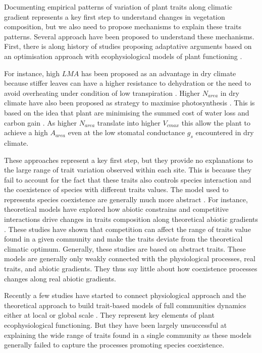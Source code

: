 \documentclass[a4paper,11pt]{article}
\begin{document}
Documenting empirical patterns of variation of plant traits along
climatic gradient represents a key first step to understand changes in
vegetation composition, but we also need to propose mechanisms to
explain these traits patterns. Several approach have been proposed to
understand these mechanisms. First, there is along history of studies
proposing adaptative arguments based on an optimisation approach with
ecophysiological models of plant functioning \citep{Makela-2002}.

For instance, high $LMA$ has been proposed as an advantage in dry climate because
stiffer leaves can have a higher resistance to dehydration
\citep{Wright-2002a,Wright-2002b} or the need to avoid overheating
under condition of low transpiration \citep{Leigh-2012}. Higher
$N_{area}$ in dry climate have also been proposed as strategy to
maximise photosynthesis \citep{Wright-2003}. This is
based on the idea that plant are minimising the summed cost of water
loss and carbon gain
\citep{Medlyn-2002,Wright-2003,Prentice-2014,Lu-2016,Wang-2017,Dong-2017}. As
higher $N_{area}$ translate into higher $V_{cmax}$ this allow the
plant to achieve a high $A_{area}$ even at the low stomatal conductance
$g_s$ encountered in dry climate.

These approaches represent a key first step, but
they provide no explanations to the large range of trait variation observed
within each site. This is because they fail to account for the fact that
these traits also controls species interaction and the coexistence of
species with different traits values. 
The model used to represents species coexistence are generally much more abstract \citep{Chesson-2018}. For instance, theoretical models have explored how abiotic constrains and competitive interactions drive changes in traits composition along theoretical abiotic gradients
\citep{Case-2000,Goldberg-2006,Leimar-2008}. These
studies have shown that competition can affect the range of traits
value found in a given community and make the traits deviate from the
theoretical climatic optimum.  Generally, these studies are based on abstract traits. These models are generally only weakly connected with the physiological processes, real traits, and abiotic gradients. They thus say little about how coexistence processes changes along real abiotic gradients. 

Recently a few studies have started to connect physiological approach
and the theoretical approach to build trait-based models of full
communities dynamics either at local \citep{Farrior-2013} or global
scale \citep[see][]{Sakschewski-2015,Scheiter-2013}. They represent key elements of plant ecophysiological functioning. But they have been largely unsuccessful at explaining the wide range of traits found in a single community as these models generally failed to capture the processes promoting species coexistence.
\end{document}
